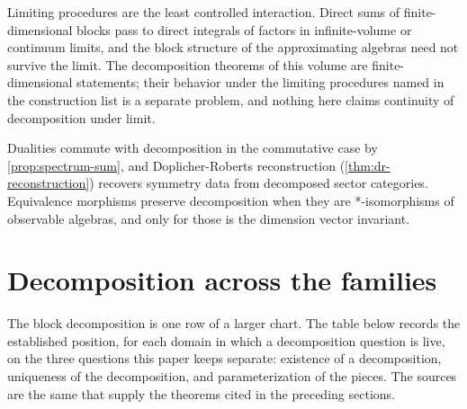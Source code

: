 \documentclass[11pt,letterpaper]{article}
\theoremstyle{definition}
\theoremstyle{remark}
\begin{document}
Limiting procedures are the least controlled interaction. Direct sums of finite-dimensional blocks pass to direct integrals of factors in infinite-volume or continuum limits, and the block structure of the approximating algebras need not survive the limit. The decomposition theorems of this volume are finite-dimensional statements; their behavior under the limiting procedures named in the construction list is a separate problem, and nothing here claims continuity of decomposition under limit.

Dualities commute with decomposition in the commutative case by \cref{prop:spectrum-sum}, and Doplicher-Roberts reconstruction (\cref{thm:dr-reconstruction}) recovers symmetry data from decomposed sector categories. Equivalence morphisms preserve decomposition when they are *-isomorphisms of observable algebras, and only for those is the dimension vector invariant.

\section{Decomposition across the families}

The block decomposition is one row of a larger chart. The table below records the established position, for each domain in which a decomposition question is live, on the three questions this paper keeps separate: existence of a decomposition, uniqueness of the decomposition, and parameterization of the pieces. The sources are the same that supply the theorems cited in the preceding sections.
\end{document}
